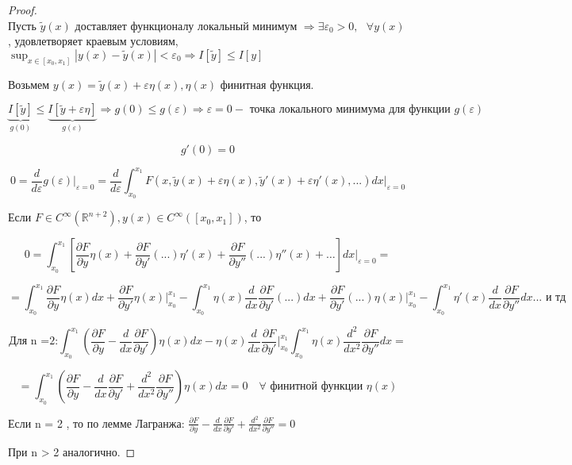 \documentclass[12pt, a4paper]{report}
\begin{document}
\begin{proof}
    \[   \] 
    Пусть \( \tilde{y }( x) \)  доставляет функционалу локальный минимум \( \Rightarrow  \exists \varepsilon_0 >0 , \text{ }  \forall  y(x )\), удовлетворяет краевым условиям, \( \displaystyle \sup_{x \in [x_0 , x_1 ] } |y(x)-\tilde{y }(x) | < \varepsilon_0  \Rightarrow I[\tilde{y }] \le  I[y] \) 

    Возьмем \( y(x ) = \tilde{y }( x ) + \varepsilon \eta ( x ), \eta(x) \)  финитная функция.

    \[ \underbrace{I[\tilde{ y }]}_{g(0)} \le  \underbrace{I[\tilde{y }+ \varepsilon \eta ]}_{g(\varepsilon)} \Rightarrow g(0 ) \le  g(\varepsilon) \Rightarrow \varepsilon = 0  - \text{ точка локального минимума для функции } g(\varepsilon) \] 

    \[ g ' (0 ) = 0 \]  

    \[ 0 = \frac{d}{d \varepsilon } g(\varepsilon ) \bigg |_{\varepsilon = 0 }  = \frac{d}{d \varepsilon} \int_{x_0 }^{x_1} F ( x, \tilde{y }( x)  + \varepsilon \eta ( x ), \tilde{y }' ( x) + \varepsilon \eta' ( x ), ...) dx \bigg |_{\varepsilon = 0} \] 

    Если \( F \in C^{\infty  } (\mathbb{R} ^{n +2 } ), y(x ) \in C^{\infty  } ([x_0 , x_1 ])    \), то 

    \[ 0 = \int_{x_0 }^{x_1} \left[ \frac{\partial  F }{\partial  y } \eta( x) + \frac{\partial F }{\partial  y' }(... )\eta' ( x )+ \frac{\partial F }{\partial y ''} (...) \eta''(x) +\dots  \right]  dx \bigg | _{\varepsilon = 0 }  =    \] 

    \[ =\int_{x_0 }^{x_1}  \frac{\partial  F }{\partial  y } \eta ( x ) dx + \frac{\partial  F } {\partial  y ' } \eta  ( x ) \bigg |_{x_0 }^{x_1}   - \int_{x_0 }^{x_1} \eta( x ) \frac{d }{dx } \frac{\partial  F }{\partial  y ' } (... )dx + \frac{\partial  F }{ \partial  y ' } (... ) \eta ( x ) \bigg |_{x_0 }^{x_1} - \int_{x_0 }^{x_1}  \eta ' ( x ) \frac{d}{dx } \frac{\partial  F }{\partial  y ''} dx ... \text{ и тд}    \] 

    \[ \text{Для n =2:}  \int_{x_0 }^{x_1} \left(  \frac{\partial  F } {\partial  y } - \frac{d}{dx } \frac{\partial F }{\partial  y '}  \right) \eta(x )dx - \eta(x ) \frac{d}{dx } \frac{\partial F }{ \partial  y '}\bigg |_{x_0 }^{x_1 } \int _{x_0 }^{x_1} \eta  ( x ) \frac{d ^2 }{dx ^2 } \frac{\partial F }{\partial y ''} dx       =  \] 

    \[ =\int_{x_0 }^{x_1} \left(  \frac{\partial  F } {\partial  y } - \frac{d}{dx } \frac{\partial F }{\partial  y '} + \frac{d ^2 }{d x ^2 } \frac{\partial F }{\partial y ''}  \right) \eta(x )dx   = 0 \quad \forall \text{ финитной функции  } \eta( x) \] 

    Если n = 2 , то по лемме Лагранжа: \( \displaystyle  \frac{\partial  F } {\partial  y } - \frac{d}{dx }  \frac{\partial  F } { \partial y ' } + \frac{d ^2 }{dx ^2 }  \frac{\partial  F }{ \partial  y''}  =0   \) 

    При n > 2 аналогично.

\end{proof}
\end{document}
